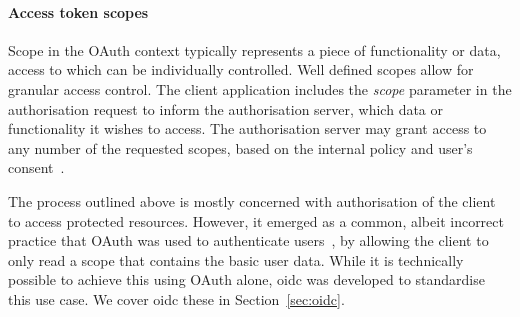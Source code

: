 \paragraph{Access token scopes}
Scope in the OAuth context typically represents a piece of functionality or data, access to which can be individually controlled. Well defined scopes allow for granular access control. The client application includes the \textit{scope} parameter in the authorisation request to inform the authorisation server, which data or functionality it wishes to access. The authorisation server may grant access to any number of the requested scopes, based on the internal policy and user's consent~\cite{Hardt2012TheFramework}.

The process outlined above is mostly concerned with authorisation of the client to access protected resources. However, it emerged as a common, albeit incorrect practice that OAuth was used to authenticate users~\cite{RicherUser2.0}, by allowing the client to only read a scope that contains the basic user data. While it is technically possible to achieve this using OAuth alone, \acrshort{oidc} was developed to standardise this use case. We cover \acrshort{oidc} these in Section~\ref{sec:oidc}.
